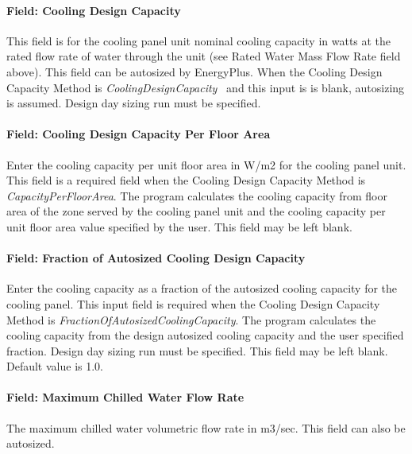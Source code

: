 \paragraph{Field: Cooling Design Capacity}\label{field-cooling-design-capacity-2}

This field is for the cooling panel unit nominal cooling capacity in watts at the rated flow rate of water through the unit (see Rated Water Mass Flow Rate field above). This field can be autosized by EnergyPlus. When the Cooling Design Capacity Method is \emph{CoolingDesignCapacity}~ and this input is is blank, autosizing is assumed. Design day sizing run must be specified.

\paragraph{Field: Cooling Design Capacity Per Floor Area}\label{field-cooling-design-capacity-per-floor-area-2}

Enter the cooling capacity per unit floor area in W/m2 for the cooling panel unit. This field is a required field when the Cooling Design Capacity Method is \emph{CapacityPerFloorArea}. The program calculates the cooling capacity from floor area of the zone served by the cooling panel unit and the cooling capacity per unit floor area value specified by the user. This field may be left blank.

\paragraph{Field: Fraction of Autosized Cooling Design Capacity}\label{field-fraction-of-autosized-cooling-design-capacity-2}

Enter the cooling capacity as a fraction of the autosized cooling capacity for the cooling panel. This input field is required when the Cooling Design Capacity Method is \emph{FractionOfAutosizedCoolingCapacity}. The program calculates the cooling capacity from the design autosized cooling capacity and the user specified fraction. Design day sizing run must be specified. This field may be left blank. Default value is 1.0.

\paragraph{Field: Maximum Chilled Water Flow Rate}\label{field-maximum-chilled-water-flow-rate}

The maximum chilled water volumetric flow rate in m3/sec.  This field can also be autosized.

